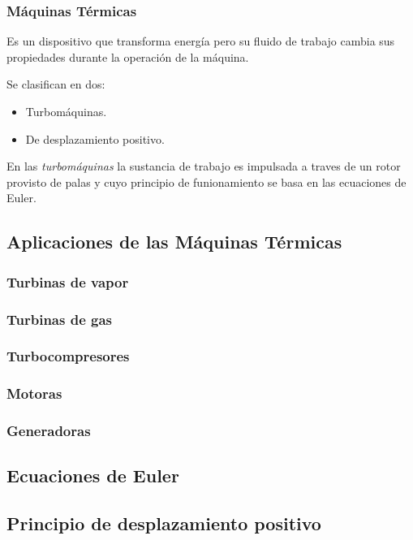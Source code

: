 \subsubsection{Máquinas Térmicas} Es un dispositivo que transforma energía pero su fluido de trabajo cambia sus propiedades durante la operación de la máquina.

Se clasifican en dos: 
\begin{itemize}
	\item Turbomáquinas.
	\item De desplazamiento positivo.
\end{itemize}

En las \textsl{turbomáquinas} la sustancia de trabajo es impulsada a traves de un rotor provisto de palas y cuyo principio de funionamiento se basa en las ecuaciones de Euler. 	

\subsection{Aplicaciones de las Máquinas Térmicas}
\subsubsection{Turbinas de vapor}
\subsubsection{Turbinas de gas}
\subsubsection{Turbocompresores}
\subsubsection{Motoras}
\subsubsection{Generadoras}

\subsection{Ecuaciones de Euler}
\subsection{Principio de desplazamiento positivo}
\lipsum[2]